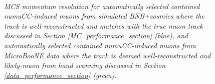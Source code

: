 
\begin{figure}
\centering
\mbox{
	\quad
	}
\caption{\textit{MCS momentum resolution for automatically selected contained numuCC-induced muons from simulated BNB+cosmics where the track is well-reconstructed and matches with the true muon track discussed in Section \ref{MC_performance_section} (blue), and automatically selected contained numuCC-induced muons from MicroBooNE data where the track is deemed well-reconstructed and likely-muon from hand scanning discussed in Section \ref{data_performance_section} (green).}}\label{pub_plot_4}
\end{figure}

